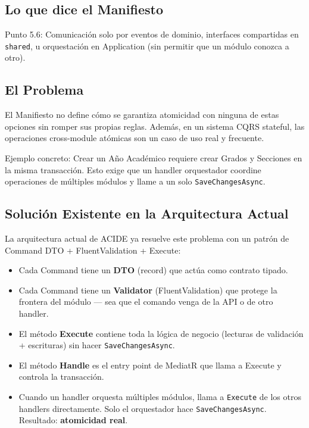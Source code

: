 \documentclass[12pt,a4paper]{article}
\begin{document}
\subsection{Lo que dice el Manifiesto}
Punto 5.6: Comunicaci\'on solo por eventos de dominio, interfaces compartidas en \texttt{shared}, u orquestaci\'on en Application (sin permitir que un m\'odulo conozca a otro).

\subsection{El Problema}
El Manifiesto no define c\'omo se garantiza atomicidad con ninguna de estas opciones sin romper sus propias reglas. Adem\'as, en un sistema CQRS stateful, las operaciones cross-module at\'omicas son un caso de uso real y frecuente.

Ejemplo concreto: Crear un A\~no Acad\'emico requiere crear Grados y Secciones en la misma transacci\'on. Esto exige que un handler orquestador coordine operaciones de m\'ultiples m\'odulos y llame a un solo \texttt{SaveChangesAsync}.

\subsection{Soluci\'on Existente en la Arquitectura Actual}
La arquitectura actual de ACIDE ya resuelve este problema con un patr\'on de Command DTO + FluentValidation + Execute:

\begin{itemize}[leftmargin=2em]
    \item Cada Command tiene un \textbf{DTO} (record) que act\'ua como contrato tipado.
    \item Cada Command tiene un \textbf{Validator} (FluentValidation) que protege la frontera del m\'odulo --- sea que el comando venga de la API o de otro handler.
    \item El m\'etodo \textbf{Execute} contiene toda la l\'ogica de negocio (lecturas de validaci\'on + escrituras) sin hacer \texttt{SaveChangesAsync}.
    \item El m\'etodo \textbf{Handle} es el entry point de MediatR que llama a Execute y controla la transacci\'on.
    \item Cuando un handler orquesta m\'ultiples m\'odulos, llama a \texttt{Execute} de los otros handlers directamente. Solo el orquestador hace \texttt{SaveChangesAsync}. Resultado: \textbf{atomicidad real}.
\end{itemize}
\end{document}
